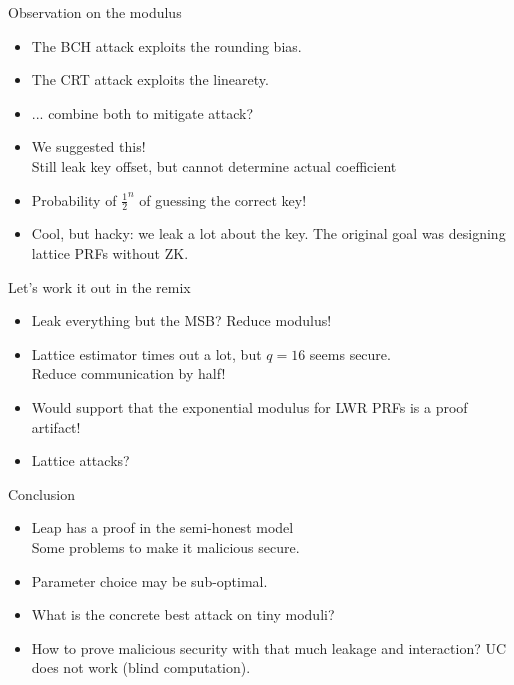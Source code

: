 \documentclass[10pt]{beamer}
\begin{document}
    \begin{frame}{Observation on the modulus}
      \begin{itemize}
        \item The BCH attack exploits the rounding bias. \pause
        \item The CRT attack exploits the linearety. \pause
        \item ... combine both to mitigate attack? \pause
        \item We suggested this! \pause \\ Still leak key \alert{offset}, but
          cannot determine actual coefficient \pause
        \item Probability of $\frac{1}{2}^n$ of guessing the correct key! \pause
        \item Cool, but hacky: we leak a lot about the key. The original goal
          was designing lattice PRFs without ZK. 
      \end{itemize}
    \end{frame}
    \begin{frame}{Let's work it out in the remix}
      \begin{itemize}
        \item Leak everything but the MSB? \pause \alert{Reduce modulus!}\pause
        \item Lattice estimator times out a lot, but $q=16$ seems secure.\pause
          \\ Reduce communication by half!\pause
        \item Would support that the exponential modulus for LWR PRFs is a proof
          artifact! \pause
        \item Lattice attacks? 
      \end{itemize}
    \end{frame}

    \begin{frame}{Conclusion}
      \begin{itemize}
        \item Leap has a proof in the semi-honest model\pause \\
          Some problems to make it malicious secure. \pause
        \item Parameter choice may be sub-optimal.\pause
        \item What is the concrete best attack on tiny moduli? \pause
        \item How to prove malicious security with that much leakage and
          interaction? UC does not work (blind computation).  
      \end{itemize}
    \end{frame}
\end{document}
